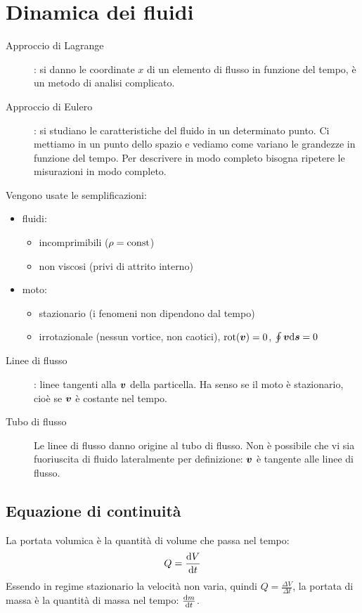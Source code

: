 \section{Dinamica dei fluidi}
\begin{description}
   \item[Approccio di Lagrange]: si danno le coordinate $x$ di un elemento di flusso in funzione del tempo, è un metodo di analisi complicato.
   \item[Approccio di Eulero]: si studiano le caratteristiche del fluido in un determinato punto. Ci mettiamo in un punto dello spazio e vediamo come variano le grandezze in funzione del tempo. Per descrivere in modo completo bisogna ripetere le misurazioni in modo completo.
\end{description}
Vengono usate le semplificazioni:
\begin{itemize}
   \item fluidi:
         \begin{itemize}
            \item incomprimibili ($\rho=\text{const}$)
            \item non viscosi (privi di attrito interno)
         \end{itemize}
   \item moto:
         \begin{itemize}
            \item stazionario (i fenomeni non dipendono dal tempo)
            \item irrotazionale (nessun vortice, non caotici), $\mathrm{rot}(\boldsymbol{v})=0$, $\oint \boldsymbol{v} \mathrm{d} \boldsymbol{s}=0$
         \end{itemize}
\end{itemize}
\begin{description}
   \item [Linee di flusso]: linee tangenti alla $\boldsymbol{v}$ della particella. Ha senso se il moto è stazionario, cioè se $\boldsymbol{v}$ è costante nel tempo.
   \item[Tubo di flusso] Le linee di flusso danno origine al tubo di flusso. Non è possibile che vi sia fuoriuscita di fluido lateralmente per definizione: $\boldsymbol{v}$ è tangente alle linee di flusso.
\end{description}

\subsection{Equazione di continuità}
\begin{Def}[Portata]
   La portata volumica è la quantità di volume che passa nel tempo: \[Q=\frac{\mathrm{d} V}{\mathrm{d} t}\]
   Essendo in regime stazionario la velocità non varia, quindi $Q=\frac{\Delta V}{\Delta t}$, la portata di massa è la quantità di massa nel tempo: $\frac{\mathrm{d} m}{\mathrm{d} t}$.
\end{Def}

